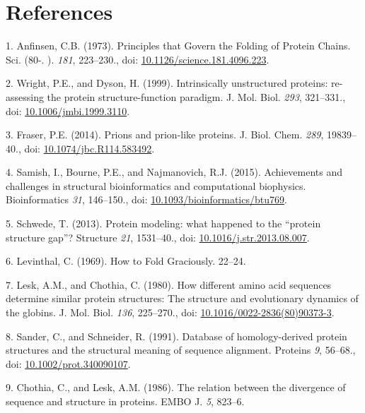 \documentclass[11pt,a4paper,twoside]{book}
\theoremstyle{definition}
\theoremstyle{definition}
\theoremstyle{remark}
\begin{document}
\chapter*{References}\label{references}

\hypertarget{refs}{}
\hypertarget{ref-Anfinsen1973}{}
1. Anfinsen, C.B. (1973). Principles that Govern the Folding of Protein
Chains. Sci. (80-. ). \emph{181}, 223--230., doi:
\href{https://doi.org/10.1126/science.181.4096.223}{10.1126/science.181.4096.223}.

\hypertarget{ref-Wright1999}{}
2. Wright, P.E., and Dyson, H. (1999). Intrinsically unstructured
proteins: re-assessing the protein structure-function paradigm. J. Mol.
Biol. \emph{293}, 321--331., doi:
\href{https://doi.org/10.1006/jmbi.1999.3110}{10.1006/jmbi.1999.3110}.

\hypertarget{ref-Fraser2014}{}
3. Fraser, P.E. (2014). Prions and prion-like proteins. J. Biol. Chem.
\emph{289}, 19839--40., doi:
\href{https://doi.org/10.1074/jbc.R114.583492}{10.1074/jbc.R114.583492}.

\hypertarget{ref-Samish2015}{}
4. Samish, I., Bourne, P.E., and Najmanovich, R.J. (2015). Achievements
and challenges in structural bioinformatics and computational
biophysics. Bioinformatics \emph{31}, 146--150., doi:
\href{https://doi.org/10.1093/bioinformatics/btu769}{10.1093/bioinformatics/btu769}.

\hypertarget{ref-Schwede2013}{}
5. Schwede, T. (2013). Protein modeling: what happened to the ``protein
structure gap''? Structure \emph{21}, 1531--40., doi:
\href{https://doi.org/10.1016/j.str.2013.08.007}{10.1016/j.str.2013.08.007}.

\hypertarget{ref-Levinthal1969}{}
6. Levinthal, C. (1969). How to Fold Graciously. 22--24.

\hypertarget{ref-Lesk1980}{}
7. Lesk, A.M., and Chothia, C. (1980). How different amino acid
sequences determine similar protein structures: The structure and
evolutionary dynamics of the globins. J. Mol. Biol. \emph{136},
225--270., doi:
\href{https://doi.org/10.1016/0022-2836(80)90373-3}{10.1016/0022-2836(80)90373-3}.

\hypertarget{ref-Sander1991}{}
8. Sander, C., and Schneider, R. (1991). Database of homology-derived
protein structures and the structural meaning of sequence alignment.
Proteins \emph{9}, 56--68., doi:
\href{https://doi.org/10.1002/prot.340090107}{10.1002/prot.340090107}.

\hypertarget{ref-Chothia1986}{}
9. Chothia, C., and Lesk, A.M. (1986). The relation between the
divergence of sequence and structure in proteins. EMBO J. \emph{5},
823--6.
\end{document}
